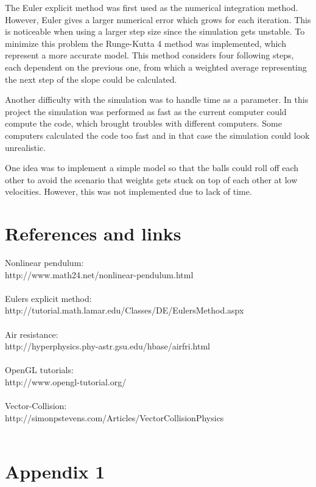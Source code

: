 \documentclass[a4paper,12pt,twoside,english]{article}
\begin{document}
The Euler explicit method was first used as the numerical integration method. However, Euler gives a larger numerical error which grows for each iteration. This is noticeable when using a larger step size since the simulation gets unstable. To minimize this problem the Runge-Kutta 4 method was implemented, which represent a more accurate model. This method considers four following steps, each dependent on the previous one, from which a weighted average representing the next step of the slope could be calculated. 

Another difficulty with the simulation was to handle time as a parameter. In this project the simulation was performed as fast as the current computer could compute the code, which brought troubles with different computers. Some computers calculated the code too fast and in that case the simulation could look unrealistic.

One idea was to implement a simple model so that the balls could roll off each other to avoid the scenario that weights gets stuck on top of each other at low velocities. However, this was not implemented due to lack of time. 

\section{References and links}

Nonlinear pendulum: \\
http://www.math24.net/nonlinear-pendulum.html \\\\
Eulers explicit method: \\
http://tutorial.math.lamar.edu/Classes/DE/EulersMethod.aspx\\\\
Air resistance: \\
http://hyperphysics.phy-astr.gsu.edu/hbase/airfri.html\\\\
OpenGL tutorials: \\
http://www.opengl-tutorial.org/\\\\
Vector-Collision: \\
http://simonpstevens.com/Articles/VectorCollisionPhysics\\\\

\newpage
{}
\section*{Appendix 1}
\end{document}
